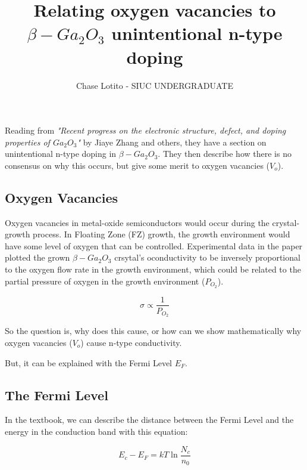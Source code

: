 \documentclass{article}
\title{Relating oxygen vacancies to \(\beta-Ga_2 O_3\) unintentional n-type doping}
\author{Chase Lotito - SIUC UNDERGRADUATE}
\date{}
\begin{document}
\pagestyle{fancy}

\maketitle

\fancyhead{}

Reading from \textit{"Recent progress on the electronic structure, defect, and doping properties of \(Ga_2 O_3\)"} by Jiaye Zhang and others, they have a section on unintentional n-type doping in \(\beta - Ga_2 O_3\). They then describe how there is no consensus on why this occurs, but give some merit to oxygen vacancies (\(V_o\)).

\subsection{Oxygen Vacancies}

Oxygen vacancies in metal-oxide semiconductors would occur during the crystal-growth process. In Floating Zone (FZ) growth, the growth environment would have some level of oxygen that can be controlled. Experimental data in the paper plotted the grown \(\beta-Ga_2 O_3\) crsytal's oconductivity to be inversely proportional to the oxygen flow rate in the growth environment, which could be related to the partial pressure of oxygen in the growth environment (\(P_{O_2}\)). 

\begin{equation}
        \sigma \propto \frac{1}{P_{O_2}}
\end{equation}

So the question is, why does this cause, or how can we show mathematically why oxygen vacancies (\(V_o\)) cause n-type conductivity. 

\bigskip

But, it can be explained with the Fermi Level \(E_F\).

\subsection{The Fermi Level}

In the textbook, we can describe the distance between the Fermi Level and the energy in the conduction band with this equation:

\begin{equation}
    E_c - E_F = kT \ln{\frac{N_c}{n_0}}
\end{equation}
\end{document}
